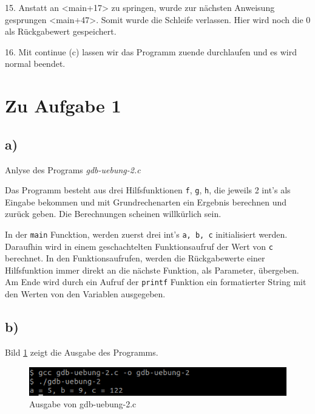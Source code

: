 \documentclass[12pt]{article}
\begin{document}

15. Anstatt an <main+17> zu springen, wurde zur nächsten Anweisung gesprungen <main+47>. Somit wurde die Schleife verlassen. Hier wird noch die 0 als Rückgabewert gespeichert. 


16. Mit continue (c) lassen wir das Programm zuende durchlaufen und es wird normal beendet.


\section{Zu Aufgabe 1}
\subsection{a)}

Anlyse des Programs \textit{gdb-uebung-2.c}



Das Programm besteht aus drei Hilfsfunktionen \texttt{f}, \texttt{g}, \texttt{h}, die jeweils 2 int's als Eingabe bekommen und mit Grundrechenarten ein Ergebnis berechnen und zurück geben. Die Berechnungen scheinen willkürlich sein. 

In der \texttt{main} Funcktion, werden zuerst drei int's \texttt{a, b, c} initialisiert werden. Daraufhin wird in einem geschachtelten Funktionsaufruf der Wert von \texttt{c} berechnet. In den Funktionsaufrufen, werden die Rückgabewerte einer Hilfsfunktion immer direkt an die nächste Funktion, als Parameter, übergeben. Am Ende wird durch ein Aufruf der \texttt{printf} Funktion ein formatierter String mit den Werten von den Variablen ausgegeben.


\subsection{b)}

Bild \ref{fig:aufgabe2b} zeigt die Ausgabe des Programms.
\begin{figure}[h!]
	\includegraphics[width=\textwidth]{Pictures/a2b.png}
	\caption{Ausgabe von gdb-uebung-2.c}
	\label{fig:aufgabe2b}
\end{figure}
\end{document}
